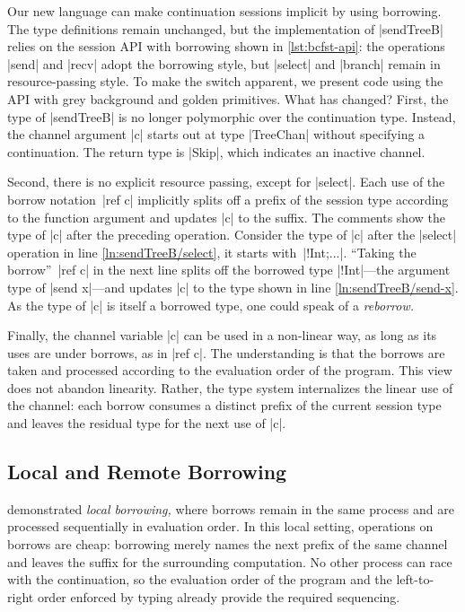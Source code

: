 \BorrowCodeStyle

Our new language {\thecalculus} can make continuation sessions implicit by
using borrowing. The type definitions 
remain unchanged, but the implementation of |sendTreeB| relies on the session
API with borrowing shown in \cref{lst:bcfst-api}: the operations |send| and
|recv| adopt the borrowing style, but |select| and |branch| remain in
resource-passing style.
To make the switch apparent, we present code using the \thecalculus{} API with
grey background and golden primitives.
%
\NumberedCode\CodeSendTreeB
%
\noindent What has changed? First, the type of |sendTreeB| is no longer
polymorphic over the continuation type. Instead, the channel argument |c| starts
out at type |TreeChan| without specifying a continuation. The return type is
|Skip|, which indicates an inactive channel.

Second, there is no explicit resource passing, except for |select|. Each use of
the borrow notation~|ref c| implicitly splits off a prefix of the session type
according to the function argument and updates |c| to the suffix. The comments
show the type of |c| after the preceding operation. Consider the type of |c|
after the |select| operation in line \ref*{ln:sendTreeB/select}, it starts
with~|!Int;...|. ``Taking the borrow''~|ref c| in the next line splits off the
borrowed type |!Int|---the argument type of |send x|---and updates |c| to the
type shown in line \ref*{ln:sendTreeB/send-x}. As the type of |c| is itself a
borrowed type, one could speak of a \emph{reborrow.}


Finally, the channel variable |c| can be used in a non-linear way, as long as
its uses are under borrows, as in |ref c|. The understanding is that the borrows
are taken and processed according to the evaluation order of the program. This
view does not abandon linearity. Rather, the type system internalizes the linear
use of the channel: each borrow consumes a distinct prefix of the current
session type and leaves the residual type for the next use of |c|.


\subsection{Local and Remote Borrowing}
\label{sec:local-remote-borr}

 demonstrated \emph{local borrowing,} where borrows
remain in the same process and are processed sequentially in
evaluation order.  In this local setting, operations on borrows are cheap:
borrowing merely names the next prefix of the same channel and leaves the suffix
for the surrounding computation. No other process can race with the
continuation, so the evaluation order of the program and the left-to-right order
enforced by typing already provide the required sequencing.

